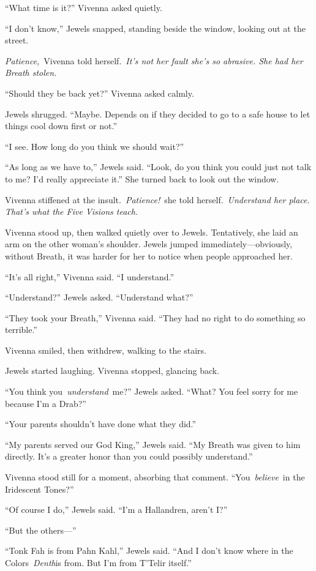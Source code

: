 “What time is it?” Vivenna asked quietly.

“I don’t know,” Jewels snapped, standing beside the window, looking out at the street.

\textit{Patience,}~Vivenna told herself.~\textit{It’s not her fault she’s so abrasive. She had her Breath stolen.}

“Should they be back yet?” Vivenna asked calmly.

Jewels shrugged. “Maybe. Depends on if they decided to go to a safe house to let things cool down first or not.”

“I see. How long do you think we should wait?”

“As long as we have to,” Jewels said. “Look, do you think you could just not talk to me? I’d really appreciate it.” She turned back to look out the window.

Vivenna stiffened at the insult.~\textit{Patience!}~she told herself.~\textit{Understand her place. That’s what the Five Visions teach.}

Vivenna stood up, then walked quietly over to Jewels. Tentatively, she laid an arm on the other woman’s shoulder. Jewels jumped immediately—obviously, without Breath, it was harder for her to notice when people approached her.

“It’s all right,” Vivenna said. “I understand.”

“Understand?” Jewels asked. “Understand what?”

“They took your Breath,” Vivenna said. “They had no right to do something so terrible.”

Vivenna smiled, then withdrew, walking to the stairs.

Jewels started laughing. Vivenna stopped, glancing back.

“You think you~\textit{understand}~me?” Jewels asked. “What? You feel sorry for me because I’m a Drab?”

“Your parents shouldn’t have done what they did.”

“My parents served our God King,” Jewels said. “My Breath was given to him directly. It’s a greater honor than you could possibly understand.”

Vivenna stood still for a moment, absorbing that comment. “You~\textit{believe}~in the Iridescent Tones?”

“Of course I do,” Jewels said. “I’m a Hallandren, aren’t I?”

“But the others—”

“Tonk Fah is from Pahn Kahl,” Jewels said. “And I don’t know where in the Colors~\textit{Denth}is from. But I’m from T’Telir itself.”

